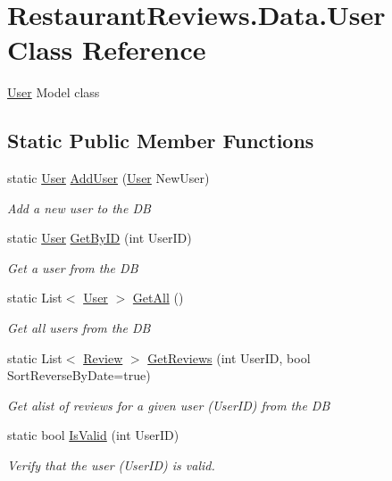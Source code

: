 \hypertarget{class_restaurant_reviews_1_1_data_1_1_user}{}\section{Restaurant\+Reviews.\+Data.\+User Class Reference}
\label{class_restaurant_reviews_1_1_data_1_1_user}


\hyperlink{class_restaurant_reviews_1_1_data_1_1_user}{User} Model class  


\subsection*{Static Public Member Functions}
\begin{DoxyCompactItemize}
\item 
static \hyperlink{class_restaurant_reviews_1_1_data_1_1_user}{User} \hyperlink{class_restaurant_reviews_1_1_data_1_1_user_a01205bc47f0a30e236c97de0d145c44d}{Add\+User} (\hyperlink{class_restaurant_reviews_1_1_data_1_1_user}{User} New\+User)
\begin{DoxyCompactList}\small\item\em Add a new user to the DB \end{DoxyCompactList}\item 
static \hyperlink{class_restaurant_reviews_1_1_data_1_1_user}{User} \hyperlink{class_restaurant_reviews_1_1_data_1_1_user_a01ad4b75fc4c5c81f716cfc943d8e5b2}{Get\+By\+ID} (int User\+ID)
\begin{DoxyCompactList}\small\item\em Get a user from the DB \end{DoxyCompactList}\item 
static List$<$ \hyperlink{class_restaurant_reviews_1_1_data_1_1_user}{User} $>$ \hyperlink{class_restaurant_reviews_1_1_data_1_1_user_ad46a52bf9590a9e44ce130eec5d37665}{Get\+All} ()
\begin{DoxyCompactList}\small\item\em Get all users from the DB \end{DoxyCompactList}\item 
static List$<$ \hyperlink{class_restaurant_reviews_1_1_data_1_1_review}{Review} $>$ \hyperlink{class_restaurant_reviews_1_1_data_1_1_user_a67268e44bc1a1af84051c0400b065237}{Get\+Reviews} (int User\+ID, bool Sort\+Reverse\+By\+Date=true)
\begin{DoxyCompactList}\small\item\em Get alist of reviews for a given user (User\+ID) from the DB \end{DoxyCompactList}\item 
static bool \hyperlink{class_restaurant_reviews_1_1_data_1_1_user_adc76df0960b94edef140885bbb0c447c}{Is\+Valid} (int User\+ID)
\begin{DoxyCompactList}\small\item\em Verify that the user (User\+ID) is valid. \end{DoxyCompactList}\end{DoxyCompactItemize}
